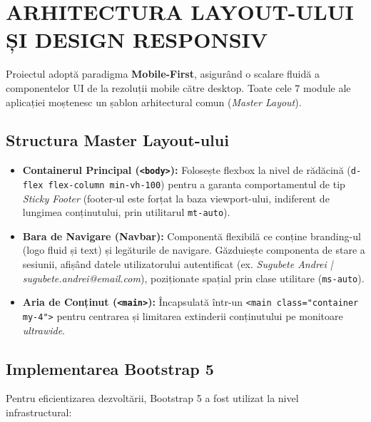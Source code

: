 \documentclass[11pt, a4paper]{article}
\begin{document}
\section{ARHITECTURA LAYOUT-ULUI ȘI DESIGN RESPONSIV}
Proiectul adoptă paradigma \textbf{Mobile-First}, asigurând o scalare fluidă a componentelor UI de la rezoluții mobile către desktop. Toate cele 7 module ale aplicației moștenesc un șablon arhitectural comun (\textit{Master Layout}).

\subsection{Structura Master Layout-ului}
\begin{itemize}
    \item \textbf{Containerul Principal (\texttt{<body>}):} Folosește flexbox la nivel de rădăcină (\texttt{d-flex flex-column min-vh-100}) pentru a garanta comportamentul de tip \textit{Sticky Footer} (footer-ul este forțat la baza viewport-ului, indiferent de lungimea conținutului, prin utilitarul \texttt{mt-auto}).
    \item \textbf{Bara de Navigare (Navbar):} Componentă flexibilă ce conține branding-ul (logo fluid și text) și legăturile de navigare. Găzduiește componenta de stare a sesiunii, afișând datele utilizatorului autentificat (ex. \textit{Sugubete Andrei | sugubete.andrei@email.com}), poziționate spațial prin clase utilitare (\texttt{ms-auto}).
    \item \textbf{Aria de Conținut (\texttt{<main>}):} Încapsulată într-un \texttt{<main class="container my-4">} pentru centrarea și limitarea extinderii conținutului pe monitoare \textit{ultrawide}.
\end{itemize}

\subsection{Implementarea Bootstrap 5}
Pentru eficientizarea dezvoltării, Bootstrap 5 a fost utilizat la nivel infrastructural:
\end{document}
